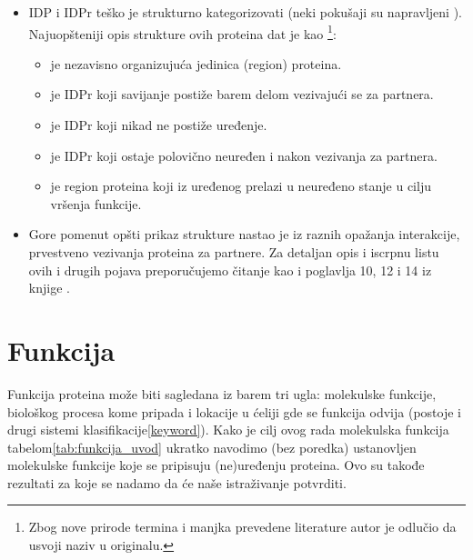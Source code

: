 \begin{itemize}
  \item 
    IDP i IDPr teško je strukturno kategorizovati \parencite{dunker2001,
    oldfield20014}(neki pokušaji su napravljeni \parencite{dunker2001}). 
    Najuopšteniji opis strukture ovih proteina dat je kao \footnote{ Zbog nove prirode termina i
      manjka prevedene literature autor je odlučio da usvoji naziv u originalu.}\parencite{uversky2016}:
    \begin{itemize}
      \item {}  je nezavisno organizujuća jedinica (region) proteina.
      \item {}  je IDPr koji savijanje postiže barem delom vezivajući se za partnera. 
      \item {}  je IDPr koji nikad ne postiže uređenje.
      \item {}  je IDPr koji ostaje polovično neuređen i nakon vezivanja za partnera.
      \item {}  je region proteina koji iz uređenog prelazi u neuređeno stanje u cilju vršenja funkcije.
    \end{itemize}

  \item 
    Gore pomenut opšti prikaz strukture nastao je iz raznih opažanja
    interakcije, prvestveno vezivanja proteina za partnere. Za detaljan opis i
    iscrpnu listu ovih i drugih pojava preporučujemo čitanje \parencite{a2z,
    uversky2016} kao i poglavlja 10, 12 i 14 iz knjige .

\end{itemize}

\section{Funkcija}
Funkcija proteina može biti sagledana iz barem tri ugla: molekulske funkcije,
biološkog procesa kome pripada i lokacije u ćeliji gde se funkcija odvija
\parencite{go2000}(postoje i drugi sistemi klasifikacije\ref{keyword}).
Kako je cilj ovog rada molekulska funkcija tabelom\ref{tab:funkcija_uvod} ukratko
navodimo (bez poredka) ustanovljen\parencite{Xie2007} molekulske funkcije koje
se pripisuju (ne)uređenju proteina. Ovo su takođe rezultati za koje se nadamo
da će naše istraživanje potvrditi.

